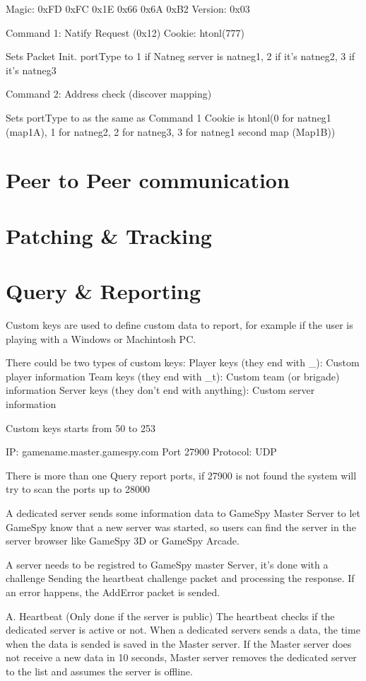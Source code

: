 \documentclass[oneside,titlepage,a4paper]{Definition/retrospy} %
\begin{document}
Magic: 0xFD 0xFC 0x1E 0x66 0x6A 0xB2
Version: 0x03

Command 1: Natify Request (0x12)
Cookie: htonl(777)

Sets Packet Init. portType to 1 if Natneg server is natneg1, 2 if it's natneg2, 3 if it's natneg3

Command 2: Address check (discover mapping)

Sets portType to as the same as Command 1
Cookie is htonl(0 for natneg1 (map1A), 1 for natneg2, 2 for natneg3, 3 for natneg1 second map (Map1B))

\chapter{Peer to Peer communication}
\chapter{Patching \& Tracking}
\chapter{Query \& Reporting}
Custom keys are used to define custom data to report, for example if the user is playing with a
Windows or Machintosh PC.

There could be two types of custom keys:
Player keys (they end with \_):
Custom player information
Team keys (they end with \_t):
Custom team (or brigade) information
Server keys (they don't end with anything):
Custom server information

Custom keys starts from 50 to 253


IP: gamename.master.gamespy.com
Port 27900
Protocol: UDP

There is more than one Query report ports, if 27900 is not found the system will 
try to scan the ports up to 28000

A dedicated server sends some information data to GameSpy Master Server to let GameSpy know
that a new server was started, so users can find the server in the server browser
like GameSpy 3D or GameSpy Arcade.

A server needs to be registred to GameSpy master Server, it's done with a challenge
Sending the heartbeat challenge packet and processing the response.
If an error happens, the AddError packet is sended.

A. Heartbeat (Only done if the server is public)
The heartbeat checks if the dedicated server is active or not.
When a dedicated servers sends a data, the time when the data is sended is saved in the Master server.
If the Master server does not receive a new data in 10 seconds, Master server removes the dedicated server
to the list and assumes the server is offline.
\end{document}
